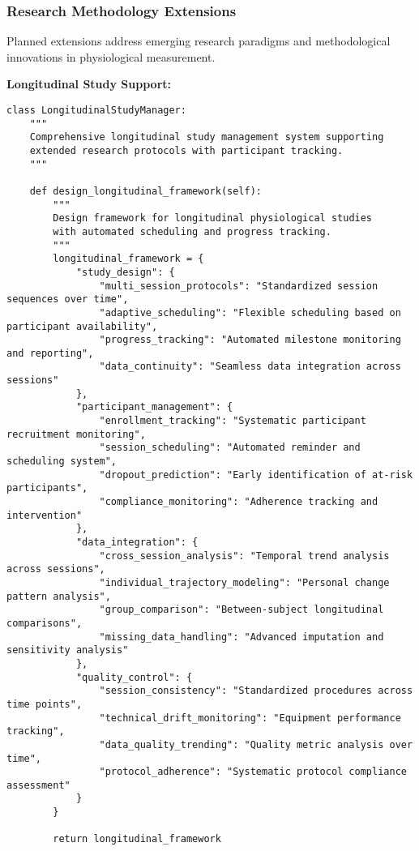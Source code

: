 \documentclass[11pt,a4paper]{article}
\begin{document}
\subsubsection{Research Methodology Extensions}

Planned extensions address emerging research paradigms and methodological innovations in physiological measurement.

\textbf{Longitudinal Study Support:}

\begin{verbatim}
class LongitudinalStudyManager:
    """
    Comprehensive longitudinal study management system supporting
    extended research protocols with participant tracking.
    """

    def design_longitudinal_framework(self):
        """
        Design framework for longitudinal physiological studies
        with automated scheduling and progress tracking.
        """
        longitudinal_framework = {
            "study_design": {
                "multi_session_protocols": "Standardized session sequences over time",
                "adaptive_scheduling": "Flexible scheduling based on participant availability",
                "progress_tracking": "Automated milestone monitoring and reporting",
                "data_continuity": "Seamless data integration across sessions"
            },
            "participant_management": {
                "enrollment_tracking": "Systematic participant recruitment monitoring",
                "session_scheduling": "Automated reminder and scheduling system",
                "dropout_prediction": "Early identification of at-risk participants",
                "compliance_monitoring": "Adherence tracking and intervention"
            },
            "data_integration": {
                "cross_session_analysis": "Temporal trend analysis across sessions",
                "individual_trajectory_modeling": "Personal change pattern analysis",
                "group_comparison": "Between-subject longitudinal comparisons",
                "missing_data_handling": "Advanced imputation and sensitivity analysis"
            },
            "quality_control": {
                "session_consistency": "Standardized procedures across time points",
                "technical_drift_monitoring": "Equipment performance tracking",
                "data_quality_trending": "Quality metric analysis over time",
                "protocol_adherence": "Systematic protocol compliance assessment"
            }
        }

        return longitudinal_framework
\end{verbatim}
\end{document}

